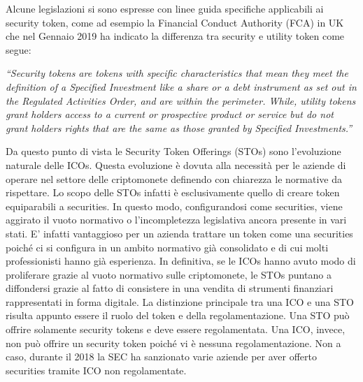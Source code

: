 Alcune legislazioni si sono espresse con linee guida specifiche applicabili ai security token, come ad esempio la Financial Conduct Authority (FCA) in UK che nel Gennaio 2019 ha indicato la differenza tra security e utility token come segue:

\textit{“Security tokens are tokens with specific characteristics that mean they meet the definition of a Specified Investment like a share or a debt instrument as set out in the Regulated Activities Order, and are within the perimeter.
While, utility tokens grant holders access to a current or prospective product or service but do not grant holders rights that are the same as those granted by Specified Investments.”}

Da questo punto di vista le Security Token Offerings (STOs) sono l'evoluzione naturale delle ICOs. Questa evoluzione è dovuta alla necessità per le aziende di operare nel settore delle criptomonete definendo con chiarezza le normative da rispettare. Lo scopo delle STOs infatti è esclusivamente quello di creare token equiparabili a securities. In questo modo, configurandosi come securities, viene aggirato il vuoto normativo o l'incompletezza legislativa ancora presente in vari stati. E' infatti vantaggioso per un azienda trattare un token come una securities poiché ci si configura in un ambito normativo già consolidato e di cui molti professionisti hanno già esperienza. In definitiva, se le ICOs hanno avuto modo di proliferare grazie al vuoto normativo sulle criptomonete, le STOs puntano a diffondersi grazie al fatto di consistere in una vendita di strumenti finanziari rappresentati in forma digitale. La distinzione principale tra una ICO e una STO risulta appunto essere il ruolo del token e della regolamentazione. Una STO può offrire solamente security tokens e deve essere regolamentata. Una ICO, invece, non può offrire un security token poiché vi è nessuna regolamentazione. Non a caso, durante il 2018 la SEC ha sanzionato varie aziende per aver offerto securities tramite ICO non regolamentate. 
